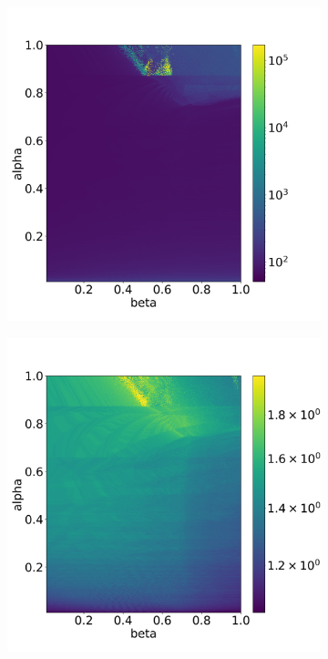 \begin{figure}[H]
    \centering
    \begin{subfigure}{0.32\textwidth}
    	\centering
    	\includegraphics[width=1\textwidth]{images/analysis_BDF23_TS.png}
        \label{fig:numberTimeStepsBDF23}
    \end{subfigure}
    \begin{subfigure}{0.32\textwidth}
    	\centering
    	\includegraphics[width=1\textwidth]{images/analysis_BDF23_NI.png}

\end{subfigure}
\end{figure}
